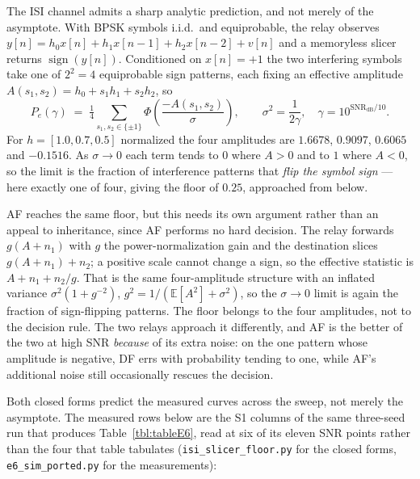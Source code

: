 The ISI channel admits a sharp analytic prediction, and not merely of the asymptote. With BPSK symbols i.i.d.\ and equiprobable, the relay observes $y[n] = h_0 x[n] + h_1 x[n-1] + h_2 x[n-2] + v[n]$ and a memoryless slicer returns $\operatorname{sign}(y[n])$. Conditioned on $x[n]=+1$ the two interfering symbols take one of $2^{2}=4$ equiprobable sign patterns, each fixing an effective amplitude $A(s_1,s_2) = h_0 + s_1 h_1 + s_2 h_2$, so
\begin{equation}\label{eq:slicer-floor}
P_e(\gamma) \;=\; \tfrac{1}{4}\!\!\sum_{s_1,s_2 \in \{\pm 1\}}\!\! \Phi\!\left(\frac{-A(s_1,s_2)}{\sigma}\right),
\qquad \sigma^{2} = \frac{1}{2\gamma},\quad \gamma = 10^{\mathrm{SNR_{dB}}/10}.
\end{equation}
For $h = [1.0, 0.7, 0.5]$ normalized the four amplitudes are $1.6678$, $0.9097$, $0.6065$ and $-0.1516$. As $\sigma \to 0$ each term tends to $0$ where $A>0$ and to $1$ where $A<0$, so the limit is the fraction of interference patterns that \emph{flip the symbol sign} --- here exactly one of four, giving the floor of $0.25$, approached from below.

AF reaches the same floor, but this needs its own argument rather than an appeal to inheritance, since AF performs no hard decision. The relay forwards $g(A + n_1)$ with $g$ the power-normalization gain and the destination slices $g(A + n_1) + n_2$; a positive scale cannot change a sign, so the effective statistic is $A + n_1 + n_2/g$. That is the same four-amplitude structure with an inflated variance $\sigma^{2}(1 + g^{-2})$, $g^{2} = 1/(\mathbb{E}[A^{2}] + \sigma^{2})$, so the $\sigma \to 0$ limit is again the fraction of sign-flipping patterns. The floor belongs to the four amplitudes, not to the decision rule. The two relays approach it differently, and AF is the better of the two at high SNR \emph{because} of its extra noise: on the one pattern whose amplitude is negative, DF errs with probability tending to one, while AF's additional noise still occasionally rescues the decision.

Both closed forms predict the measured curves across the sweep, not merely the asymptote. The measured rows below are the S1 columns of the same three-seed run that produces Table~\ref{tbl:tableE6}, read at six of its eleven SNR points rather than the four that table tabulates (\texttt{isi\_slicer\_floor.py} for the closed forms, \texttt{e6\_sim\_ported.py} for the measurements):

